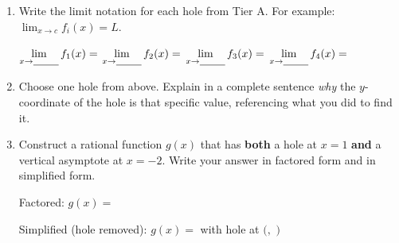 \documentclass[10pt]{article}
\begin{document}
\begin{tcolorbox}[colback=white, colframe=black!40,
    title=\textbf{Tier E --- Extend},
    fonttitle=\bfseries, arc=2mm, left=3mm, right=3mm, top=2mm, bottom=2mm]

\begin{enumerate}[itemsep=10pt]
  \item Write the limit notation for each hole from Tier A.
        For example: $\lim_{x \to c} f_i(x) = L$.

        \medskip
        $\displaystyle\lim_{x \to \blank{0.8cm}} f_1(x) = $ \blank{1.5cm} \qquad
        $\displaystyle\lim_{x \to \blank{0.8cm}} f_2(x) = $ \blank{1.5cm} \qquad
        $\displaystyle\lim_{x \to \blank{0.8cm}} f_3(x) = $ \blank{1.5cm} \qquad
        $\displaystyle\lim_{x \to \blank{0.8cm}} f_4(x) = $ \blank{1.5cm}

  \item Choose one hole from above. Explain in a complete sentence \textit{why} the
        $y$-coordinate of the hole is that specific value, referencing what you did to find it.

        \vspace{0.06in}

  \item Construct a rational function $g(x)$ that has \textbf{both} a hole at $x = 1$
        \textbf{and} a vertical asymptote at $x = -2$. Write your answer in factored form
        and in simplified form.

        \vspace{0.06in}
        Factored: $g(x) = $ \blank{6cm}

        \vspace{0.06in}
        Simplified (hole removed): $g(x) = $ \blank{5cm} \quad with hole at $\Big($\blank{0.8cm}$,$ \blank{1.5cm}$\Big)$
\end{enumerate}
\end{tcolorbox}
\end{document}
